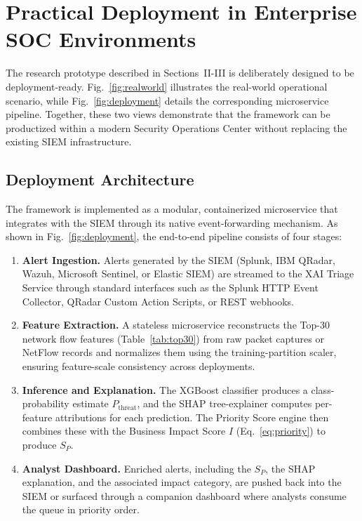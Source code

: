 \documentclass[conference]{IEEEtran}
\begin{document}
\section{Practical Deployment in Enterprise SOC Environments}

The research prototype described in Sections~II-III is deliberately designed to be deployment-ready. Fig.~\ref{fig:realworld} illustrates the real-world operational scenario, while Fig.~\ref{fig:deployment} 
details the corresponding microservice pipeline. Together, these two views demonstrate that the framework can be productized within a modern Security Operations Center without replacing the existing SIEM infrastructure.

\subsection{Deployment Architecture}

The framework is implemented as a modular, containerized microservice 
that integrates with the SIEM through its native event-forwarding 
mechanism. As shown in Fig.~\ref{fig:deployment}, the end-to-end 
pipeline consists of four stages:

\begin{enumerate}
    \item \textbf{Alert Ingestion.} Alerts generated by the SIEM 
    (Splunk, IBM QRadar, Wazuh, Microsoft Sentinel, or Elastic SIEM) 
    are streamed to the XAI Triage Service through standard 
    interfaces such as the Splunk HTTP Event Collector, QRadar 
    Custom Action Scripts, or REST webhooks.
    
    \item \textbf{Feature Extraction.} A stateless microservice 
    reconstructs the Top-30 network flow features (Table~\ref{tab:top30}) 
    from raw packet captures or NetFlow records and normalizes them 
    using the training-partition scaler, ensuring feature-scale 
    consistency across deployments.
    
    \item \textbf{Inference and Explanation.} The XGBoost classifier 
    produces a class-probability estimate $P_{\text{threat}}$, and 
    the SHAP tree-explainer computes per-feature attributions for 
    each prediction. The Priority Score engine then combines these 
    with the Business Impact Score $I$ (Eq.~\ref{eq:priority}) to 
    produce $S_P$.
    
    \item \textbf{Analyst Dashboard.} Enriched alerts, including the 
    $S_P$, the SHAP explanation, and the associated impact category, 
    are pushed back into the SIEM or surfaced through a companion 
    dashboard where analysts consume the queue in priority order.
\end{enumerate}
\end{document}

